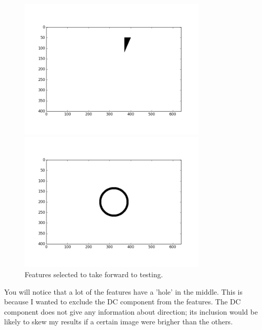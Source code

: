 \documentclass[11pt, a4paper]{article}
\begin{document}
\begin{figure}[ht]
\begin{minipage}[b]{0.3\textwidth}
	\end{minipage}
	\begin{minipage}[b]{0.3\textwidth}
		\includegraphics[trim={2cm 2cm 2cm 2cm},clip,width=0.8\textwidth]{features/triangle.png}
	\end{minipage}
	\begin{minipage}[b]{0.3\textwidth}
		\includegraphics[trim={2cm 2cm 2cm 2cm},clip,width=0.8\textwidth]{features/ring.png}
	\end{minipage}
	\caption{Features selected to take forward to testing.}
	\label{fig:features}
\end{figure}
You will notice that a lot of the features have a 'hole' in the middle. This is because I wanted to exclude the DC component from the features. The DC component does not give any information about direction; its inclusion would be likely to skew my results if a certain image were brigher than the others. 
\end{document}
